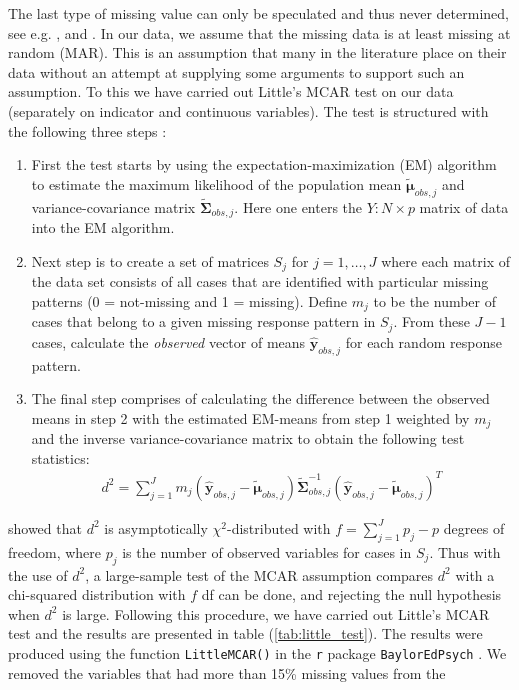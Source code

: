 \documentclass[../thesis.tex]{subfiles}
\begin{document}
\noindent The last type of missing value can only be speculated and thus never determined, see e.g. \cite{rubin1976inference}, \cite{schafer2002missing} and \cite{moons2006using}. In our data, we assume that the missing data is at least missing at random (MAR). This is an assumption that many in the literature place on their data without an attempt at supplying some arguments to support such an assumption. To this we have carried out Little's MCAR test \citep{little1988test} on our data (separately on indicator and continuous variables). The test is structured with the following three steps : 
\begin{enumerate}[label=(\roman*)]
    \item First the test starts by using the expectation-maximization (EM) algorithm \citep{dempster1977maximum} to estimate the maximum likelihood of the population mean $\bm{\tilde{\mu}}_{obs, j}$ and variance-covariance matrix $\bm{\tilde{\Sigma}}_{obs,j}$. Here one enters the $Y:N\times p$ matrix of data into the EM algorithm.
    \item Next step is to create a set of matrices $S_j$ for $j = 1, \hdots, J$ where each matrix of the data set consists of all cases that are identified with particular missing patterns (0 = not-missing and 1 = missing). Define $m_j$ to be the number of cases that belong to a given missing response pattern in $S_j$. From these $J-1$ cases, calculate the \textit{observed} vector of means $\bm{\hat{y}}_{obs, j}$ for each random response pattern. 
    \item The final step comprises of calculating the difference between the observed means in step 2 with the estimated EM-means from step 1 weighted by $m_j$ and the inverse variance-covariance matrix to obtain the following test statistics:
    \begin{align}
        d^2 = \sum_{j=1}^J m_j \left(\bm{\hat{y}}_{obs, j} -  \bm{\tilde{\mu}}_{obs, j}\right)\bm{\tilde{\Sigma}}_{obs,j}^{-1}\left(\bm{\hat{y}}_{obs, j} -  \bm{\tilde{\mu}}_{obs, j}\right)^T
    \end{align}
\end{enumerate}

\noindent \cite{little1988test} showed that $d^2$ is asymptotically $\chi^2$-distributed with $f = \sum_{j=1}^J p_j - p$ degrees of freedom, where $p_j$ is the number of observed variables for cases in $S_j$. Thus with the use of $d^2$, a large-sample test of the MCAR assumption compares $d^2$ with a chi-squared distribution with $f$ df can be done, and rejecting the null hypothesis when $d^2$ is large. Following this procedure, we have carried out Little's MCAR test and the results are presented in table (\ref{tab:little_test}). The results were produced using the function \texttt{LittleMCAR()} in the \texttt{r} package \texttt{BaylorEdPsych} \citep{BaylorEdPsych}. We removed the variables that had more than 15\% missing values from the
\end{document}
